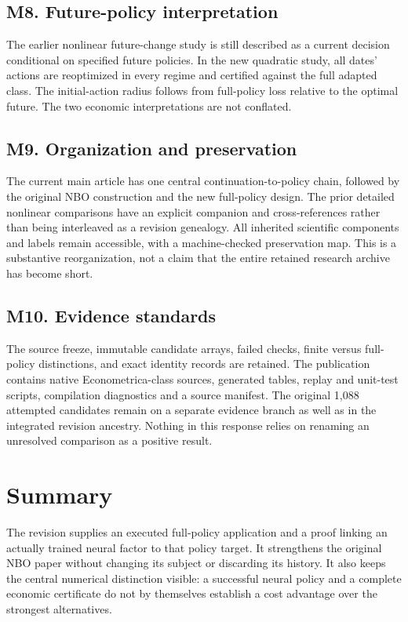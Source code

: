 \subsection*{M8. Future-policy interpretation}
The earlier nonlinear future-change study is still described as a current
decision conditional on specified future policies. In the new quadratic
study, all dates' actions are reoptimized in every regime and certified
against the full adapted class. The initial-action radius follows from
full-policy loss relative to the optimal future. The two economic
interpretations are not conflated.

\subsection*{M9. Organization and preservation}
The current main article has one central continuation-to-policy chain,
followed by the original NBO construction and the new full-policy design.
The prior detailed nonlinear comparisons have an explicit companion and
cross-references rather than being interleaved as a revision genealogy.
All inherited scientific components and labels remain accessible, with a
machine-checked preservation map. This is a substantive reorganization,
not a claim that the entire retained research archive has become short.

\subsection*{M10. Evidence standards}
The source freeze, immutable candidate arrays, failed checks, finite versus
full-policy distinctions, and exact identity records are retained. The
publication contains native Econometrica-class sources, generated tables,
replay and unit-test scripts, compilation diagnostics and a source manifest.
The original 1,088 attempted candidates remain on a separate evidence
branch as well as in the integrated revision ancestry. Nothing in this
response relies on renaming an unresolved comparison as a positive result.

\section*{Summary}
The revision supplies an executed full-policy application and a proof linking
an actually trained neural factor to that policy target. It strengthens the
original NBO paper without changing its subject or discarding its history.
It also keeps the central numerical distinction visible: a successful
neural policy and a complete economic certificate do not by themselves
establish a cost advantage over the strongest alternatives.
